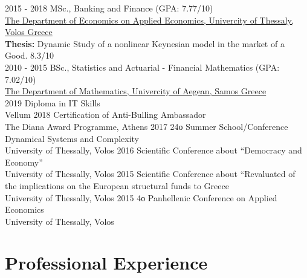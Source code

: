 \documentclass[letterpaper]{engineer_cv} %
\begin{document}
	\begin{longList} %
		\longListItem
			{2015 - 2018}
			{}
			{MSc., Banking and Finance \textnormal{(GPA: 7.77/10)}}
			{\\\href{https://www.econ.uth.gr/}{The Department of Economics on Applied Economics, Univercity of Thessaly, Volos Greece}\\{{\bf Thesis:} Dynamic Study of a nonlinear Keynesian model in the market of a Good. 8.3/10}}
			{}
			{}
			\\
		\longListItem
			{2010 - 2015}
			{}
			{BSc., Statistics and Actuarial - Financial Mathematics \textnormal{(GPA: 7.02/10)}}
			{\\\href{https://www.math.aegean.gr/}{The Department of Mathematics, Univercity of Aegean, Samos Greece}}
			{}
			{}
			\\
		\longListItem
			{2019}
			{}
			{Diploma in IT Skills}
			{\\Vellum}
			{}
			{}
		\longListItem
			{2018}
			{}
			{Certification of Anti-Bulling Ambassador}
			{\\The Diana Award Programme, Athens}
			{}
			{}
		\longListItem
			{2017}
			{}
			{24ο Summer School/Conference Dynamical Systems and Complexity}
			{\\University of Thessally, Volos}
			{}
			{}
		\longListItem
			{2016}
			{}
			{Scientific Conference about “Democracy and Economy”}
			{\\University of Thessally, Volos}
			{}
			{}
		\longListItem
			{2015}
			{}
			{Scientific Conference about “Revaluated of the implications on the European structural funds to Greece}
			{\\University of Thessally, Volos}
			{}
			{}
		\longListItem
			{2015}
			{}
			{4ο Panhellenic Conference on Applied Economics}
			{\\University of Thessally, Volos}
			{}
			{}
	\end{longList}



	\section{Professional Experience}
\end{document}
